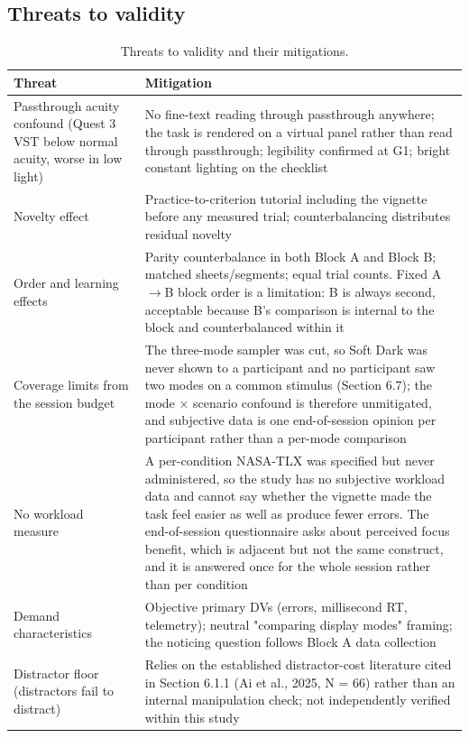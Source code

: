 \subsection{Threats to validity}

\begin{longtable}{p{}|p{}}
\caption{Threats to validity and their mitigations.}\\
\hline
\textbf{Threat} & \textbf{Mitigation} \\
\hline
\endhead
\hline
Passthrough acuity confound (Quest 3 VST below normal acuity, worse in low light) & No fine-text reading through passthrough anywhere; the task is rendered on a virtual panel rather than read through passthrough; legibility confirmed at G1; bright constant lighting on the checklist \\
Novelty effect & Practice-to-criterion tutorial including the vignette before any measured trial; counterbalancing distributes residual novelty \\
Order and learning effects & Parity counterbalance in both Block A and Block B; matched sheets/segments; equal trial counts. Fixed A$\rightarrow$B block order is a limitation: B is always second, acceptable because B's comparison is internal to the block and counterbalanced within it \\
Coverage limits from the session budget & The three-mode sampler was cut, so Soft Dark was never shown to a participant and no participant saw two modes on a common stimulus (Section 6.7); the mode $\times$ scenario confound is therefore unmitigated, and subjective data is one end-of-session opinion per participant rather than a per-mode comparison \\
No workload measure & A per-condition NASA-TLX was specified but never administered, so the study has no subjective workload data and cannot say whether the vignette made the task feel easier as well as produce fewer errors. The end-of-session questionnaire asks about perceived focus benefit, which is adjacent but not the same construct, and it is answered once for the whole session rather than per condition \\
Demand characteristics & Objective primary DVs (errors, millisecond RT, telemetry); neutral "comparing display modes" framing; the noticing question follows Block A data collection \\
Distractor floor (distractors fail to distract) & Relies on the established distractor-cost literature cited in Section 6.1.1 (Ai et al., 2025, N = 66) rather than an internal manipulation check; not independently verified within this study \\

\end{longtable}
